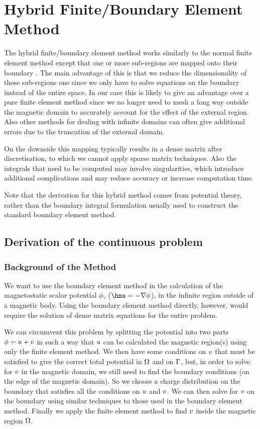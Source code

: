 
\chapter{Hybrid Finite/Boundary Element Method}
\label{sec:hybr-finit-elem}
The hybrid finite/boundary element method works similarly to the normal finite element method except that one or more sub-regions are mapped onto their boundary \cite{Rammohan2002}.
The main advantage of this is that we reduce the dimensionality of these sub-regions one since we only have to solve equations on the boundary instead of the entire space.
In our case this is likely to give an advantage over a pure finite element method since we no longer need to mesh a long way outside the magnetic domain to accurately account for the effect of the external region. Also other methods for dealing with infinite domains can often give additional errors due to the truncation of the external domain.\cite{Bottauscio2008}

On the downside this mapping typically results in a dense matrix after discretisation, to which we cannot apply sparse matrix techniques.
Also the integrals that need to be computed may involve singularities, which introduce additional complications and may reduce accuracy or increase computation time.

Note that the derivation for this hybrid method comes from potential theory, rather than the boundary integral formulation usually used to construct the standard boundary element method.

\section{Derivation of the continuous problem}
\label{sec:bem-derivation}

\subsection{Background of the Method}
\label{sec:basic-method}
We want to use the boundary element method in the calculation of the magnetostatic scalar potential $\phi$, ($\hms = - \nabla \phim$), in the infinite region outside of a magnetic body.
Using the boundary element method directly, however, would require the solution of dense matrix equations for the entire problem.

We can circumvent this problem by splitting the potential into two parts $\phi = u + v$ in such a way that $u$ can be calculated the magnetic region(s) using only the finite element method.
We then have some conditions on $v$ that must be satisfied to give the correct total potential in $\Omega$ and on ${\Gamma}$, but, in order to solve for $v$ in the magnetic domain, we still need to find the boundary conditions (on the edge of the magnetic domain).
So we choose a charge distribution on the boundary that satisfies all the conditions on $u$ and $v$.
We can then solve for $v$ on the boundary using similar techniques to those used in the boundary element method.
Finally we apply the finite element method to find $v$ inside the magnetic region $\Omega$.

